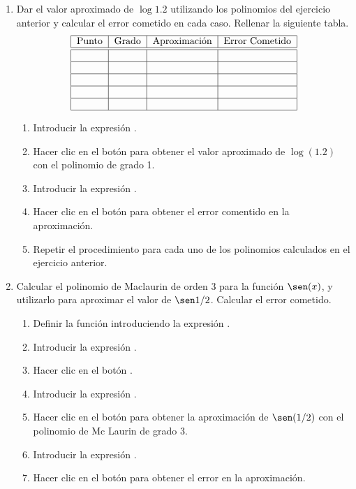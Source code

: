 \begin{enumerate}[leftmargin=*]
\item Dar el valor aproximado de $\log 1.2$ utilizando los polinomios del ejercicio anterior y calcular el error cometido en cada caso. 
Rellenar la siguiente tabla.
\[
\begin{tabular}{|c|c|c|c|}
\hline
Punto & Grado & Aproximación
& Error Cometido \\
\hline\hline
&  &  &  \\ \hline
&  &  &  \\ \hline
&  &  &  \\ \hline
&  &  &  \\ \hline
&  &  &  \\ \hline
\end{tabular}
\]

\begin{indicacion}
\begin{enumerate}
\item Introducir la expresión .
\item Hacer clic en el botón  para obtener el valor aproximado de $\log(1.2)$ con el polinomio de grado
1. 
\item Introducir la expresión .
\item Hacer clic en el botón  para obtener el error comentido en la aproximación.
\item Repetir el procedimiento para cada uno de los polinomios calculados en el ejercicio anterior. 
\end{enumerate}
\end{indicacion}

\item Calcular el polinomio de Maclaurin de orden 3 para la función $\sen(x)$, y utilizarlo para aproximar el valor de
$\sen 1/2$.
Calcular el error cometido.

\begin{indicacion}
\begin{enumerate}
\item Definir la función introduciendo la expresión . 
\item Introducir la expresión .
\item Hacer clic en el botón .
\item Introducir la expresión .
\item Hacer clic en el botón  para obtener la aproximación de $\sen(1/2)$ con el polinomio de Mc Laurin
de grado 3.
\item Introducir la expresión .
\item Hacer clic en el botón  para obtener el error en la aproximación.
\end{enumerate}
\end{indicacion}


\end{enumerate}
